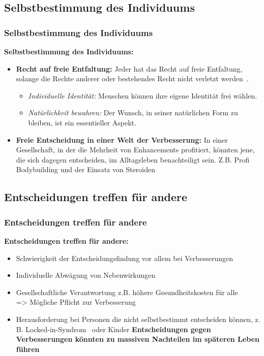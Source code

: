 \documentclass[aspectratio=169,16pt,xcolor=table]{beamer}
\begin{document}
\subsection{Selbstbestimmung des Individuums}
\begin{frame}
  \frametitle{Selbstbestimmung des Individuums}
  \textbf{Selbstbestimmung des Individuums:}
  \begin{itemize}
    \item \textbf{Recht auf freie Entfaltung:} Jeder hat das Recht auf freie Entfaltung, solange die Rechte anderer oder bestehendes Recht nicht verletzt werden~\cite{fur1996grundgesetz}.
    \begin{itemize}
      \item \textit{Individuelle Identität:} Menschen können ihre eigene Identität frei wählen.
      \item \textit{Natürlichkeit bewahren:} Der Wunsch, in seiner natürlichen Form zu bleiben, ist ein essentieller Aspekt.
    \end{itemize}
    \item \textbf{Freie Entscheidung in einer Welt der Verbesserung:} In einer Gesellschaft, in der die Mehrheit von Enhancements profitiert, könnten jene, die sich dagegen entscheiden, im Alltagsleben benachteiligt sein. Z.B. Profi Bodybuilding und der Einsatz von Steroiden
  \end{itemize}
\end{frame}

\subsection{Entscheidungen treffen für andere}
\begin{frame}
  \frametitle{Entscheidungen treffen für andere}
  \textbf{Entscheidungen treffen für andere:}
  \begin{itemize}
    \item Schwierigkeit der Entscheidungsfindung vor allem bei Verbesserungen~\cite{plavsienkova2021healthy}
    \item Individuelle Abwägung von Nebenwirkungen
    \item Gesellschaftliche Verantwortung z.B. höhere Gesundheitskosten für alle\\
    => Mögliche Pflicht zur Verbesserung
    \item Herausforderung bei Personen die nicht selbstbestimmt entscheiden können, z. B. Locked-in-Syndrom~\cite{das2022locked} oder Kinder
    \textbf{Entscheidungen gegen Verbesserungen könnten zu massiven Nachteilen im späteren Leben führen}
  \end{itemize}
\end{frame}
\end{document}
